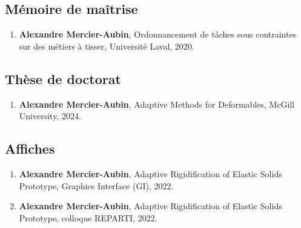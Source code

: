 \documentclass[10pt]{article} %
\begin{document}
\subsection{Mémoire de maîtrise}
\begin{enumerate}
  \setcounter{enumi}{\value{listCounter}}
  \item \textbf{Alexandre Mercier-Aubin}, Ordonnancement de tâches sous contraintes sur des métiers à tisser, Université Laval, 2020. 
\end{enumerate}

\subsection{Thèse de doctorat}
\begin{enumerate}
  \setcounter{enumi}{\value{listCounter}}
  \item \textbf{Alexandre Mercier-Aubin}, Adaptive Methods for Deformables, McGill University, 2024. 
\end{enumerate}

\subsection{Affiches}
\begin{enumerate}
  \setcounter{enumi}{\value{listCounter}}
  \item \textbf{Alexandre Mercier-Aubin}, Adaptive Rigidification of Elastic Solids Prototype, Graphics Interface (GI), 2022. 
  \item \textbf{Alexandre Mercier-Aubin}, Adaptive Rigidification of Elastic Solids Prototype, colloque REPARTI, 2022. 
\end{enumerate}
\end{document}
